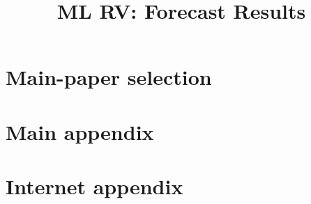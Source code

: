 \documentclass[11pt]{article}
\begin{document}
\title{ML RV: Forecast Results}
\author{}
\date{}
\maketitle

\clearpage
\section{Main-paper selection}

\clearpage\appendix\section{Main appendix}

\clearpage\section{Internet appendix}

\end{document}
